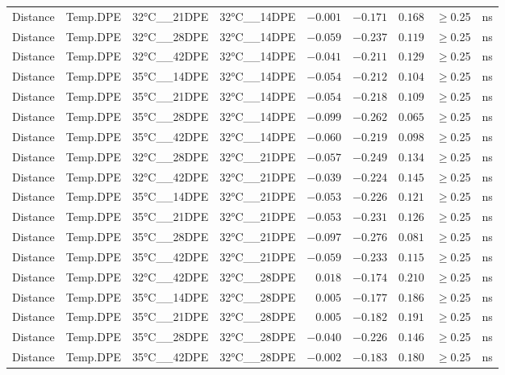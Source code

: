\documentclass[
]{article}
\begin{document}
\begin{longtable}{llllrrrrl}
Distance & Temp.DPE & 32°C\_\_21DPE & 32°C\_\_14DPE & $-0.001$ & $-0.171$ & $0.168$ & $\geq$0.25 & ns \\ 
Distance & Temp.DPE & 32°C\_\_28DPE & 32°C\_\_14DPE & $-0.059$ & $-0.237$ & $0.119$ & $\geq$0.25 & ns \\ 
Distance & Temp.DPE & 32°C\_\_42DPE & 32°C\_\_14DPE & $-0.041$ & $-0.211$ & $0.129$ & $\geq$0.25 & ns \\ 
Distance & Temp.DPE & 35°C\_\_14DPE & 32°C\_\_14DPE & $-0.054$ & $-0.212$ & $0.104$ & $\geq$0.25 & ns \\ 
Distance & Temp.DPE & 35°C\_\_21DPE & 32°C\_\_14DPE & $-0.054$ & $-0.218$ & $0.109$ & $\geq$0.25 & ns \\ 
Distance & Temp.DPE & 35°C\_\_28DPE & 32°C\_\_14DPE & $-0.099$ & $-0.262$ & $0.065$ & $\geq$0.25 & ns \\ 
Distance & Temp.DPE & 35°C\_\_42DPE & 32°C\_\_14DPE & $-0.060$ & $-0.219$ & $0.098$ & $\geq$0.25 & ns \\ 
Distance & Temp.DPE & 32°C\_\_28DPE & 32°C\_\_21DPE & $-0.057$ & $-0.249$ & $0.134$ & $\geq$0.25 & ns \\ 
Distance & Temp.DPE & 32°C\_\_42DPE & 32°C\_\_21DPE & $-0.039$ & $-0.224$ & $0.145$ & $\geq$0.25 & ns \\ 
Distance & Temp.DPE & 35°C\_\_14DPE & 32°C\_\_21DPE & $-0.053$ & $-0.226$ & $0.121$ & $\geq$0.25 & ns \\ 
Distance & Temp.DPE & 35°C\_\_21DPE & 32°C\_\_21DPE & $-0.053$ & $-0.231$ & $0.126$ & $\geq$0.25 & ns \\ 
Distance & Temp.DPE & 35°C\_\_28DPE & 32°C\_\_21DPE & $-0.097$ & $-0.276$ & $0.081$ & $\geq$0.25 & ns \\ 
Distance & Temp.DPE & 35°C\_\_42DPE & 32°C\_\_21DPE & $-0.059$ & $-0.233$ & $0.115$ & $\geq$0.25 & ns \\ 
Distance & Temp.DPE & 32°C\_\_42DPE & 32°C\_\_28DPE & $0.018$ & $-0.174$ & $0.210$ & $\geq$0.25 & ns \\ 
Distance & Temp.DPE & 35°C\_\_14DPE & 32°C\_\_28DPE & $0.005$ & $-0.177$ & $0.186$ & $\geq$0.25 & ns \\ 
Distance & Temp.DPE & 35°C\_\_21DPE & 32°C\_\_28DPE & $0.005$ & $-0.182$ & $0.191$ & $\geq$0.25 & ns \\ 
Distance & Temp.DPE & 35°C\_\_28DPE & 32°C\_\_28DPE & $-0.040$ & $-0.226$ & $0.146$ & $\geq$0.25 & ns \\ 
Distance & Temp.DPE & 35°C\_\_42DPE & 32°C\_\_28DPE & $-0.002$ & $-0.183$ & $0.180$ & $\geq$0.25 & ns \\ 

\end{longtable}
\end{document}
